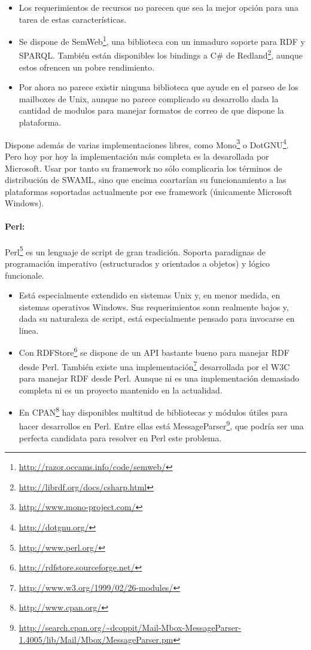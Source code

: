 \begin{itemize}
  \item Los requerimientos de recursos no parecen que sea la mejor opción para una tarea
	de estas características.
  \item Se dispone de SemWeb\footnote{\url{http://razor.occams.info/code/semweb/}}, una
	biblioteca con un inmaduro soporte para RDF y SPARQL. También están disponibles los 
	bindings a C\# de Redland\footnote{\url{http://librdf.org/docs/csharp.html}}, 
	aunque estos ofrencen un pobre rendimiento.
  \item Por ahora no parece existir ninguna biblioteca que ayude en el parseo de los mailboxes 
	de Unix, aunque no parece complicado su desarrollo dada la cantidad de modulos para 
	manejar formatos de correo de que dispone la plataforma.
\end{itemize}

Dispone además de varias implementaciones libres, como 
Mono\footnote{\url{http://www.mono-project.com/}} o DotGNU\footnote{\url{http://dotgnu.org/}}.
Pero hoy por hoy la implementación más completa es la desarollada por Microsoft. Usar por 
tanto su framework no sólo complicaria los términos de distribución de SWAML, sino que 
encima coartarían su funcionamiento a las plataformas soportadas actualmente por ese 
framework (únicamente Microsoft Windows).


\paragraph{Perl:}Perl\footnote{\url{http://www.perl.org/}} es un lenguaje de script de 
gran tradición. Soporta paradignas de programación imperativo (estructurados y orientados 
a objetos) y lógico funcionale.

\begin{itemize}
  \item Está especialmente extendido en sistemas Unix y, en menor medida, en sistemas
	operativos Windows. Sus requerimientos sonn realmente bajos y, dada su naturaleza
	de script, está especialmente pensado para invocarse en linea.
  \item Con RDFStore\footnote{\url{http://rdfstore.sourceforge.net/}} se dispone de un 
	API bastante bueno para manejar RDF desde Perl. También existe una
	implementación\footnote{\url{http://www.w3.org/1999/02/26-modules/}} 
	desarrollada por el W3C para manejar RDF desde Perl. Aunque ni es una implementación
	demasiado completa ni es un proyecto mantenido en la actualidad.
  \item En CPAN\footnote{\url{http://www.cpan.org/}} hay disponibles multitud de bibliotecas
	y módulos útiles para hacer desarrollos en Perl. Entre ellas está
	MessageParser\footnote{\url{http://search.cpan.org/~dcoppit/Mail-Mbox-MessageParser-1.4005/lib/Mail/Mbox/MessageParser.pm}},
	que podría ser una perfecta candidata para resolver en Perl este problema.
\end{itemize}


